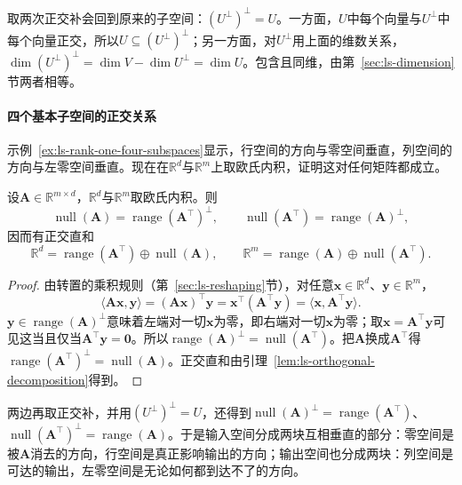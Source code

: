取两次正交补会回到原来的子空间：$(U^\perp)^\perp=U$。一方面，$U$中每个向量与$U^\perp$中每个向量正交，所以$U\subseteq(U^\perp)^\perp$；另一方面，对$U^\perp$用上面的维数关系，$\dim(U^\perp)^\perp=\dim V-\dim U^\perp=\dim U$。包含且同维，由第~\ref{sec:ls-dimension}节两者相等。

\paragraph{四个基本子空间的正交关系}
示例~\ref{ex:ls-rank-one-four-subspaces}显示，行空间的方向与零空间垂直，列空间的方向与左零空间垂直。现在在$\mathbb R^d$与$\mathbb R^m$上取欧氏内积，证明这对任何矩阵都成立。
\begin{theorem}[四个基本子空间的正交关系]
\label{thm:ls-four-subspaces-orthogonality}
设$\bm A\in\mathbb R^{m\times d}$，$\mathbb R^d$与$\mathbb R^m$取欧氏内积。则
\begin{equation}
 \operatorname{null}(\bm A)=\operatorname{range}(\bm A^\top)^\perp,\qquad
 \operatorname{null}(\bm A^\top)=\operatorname{range}(\bm A)^\perp,
 \label{eq:ls-four-subspaces-orthogonality}
\end{equation}
因而有正交直和
\begin{equation}
 \mathbb R^d=\operatorname{range}(\bm A^\top)\oplus\operatorname{null}(\bm A),\qquad
 \mathbb R^m=\operatorname{range}(\bm A)\oplus\operatorname{null}(\bm A^\top).
 \label{eq:ls-four-subspaces-decomposition}
\end{equation}
\end{theorem}
\begin{proof}
由转置的乘积规则（第~\ref{sec:ls-reshaping}节），对任意$\bm x\in\mathbb R^d$、$\bm y\in\mathbb R^m$，
\[
 \langle\bm A\bm x,\bm y\rangle=(\bm A\bm x)^\top\bm y=\bm x^\top(\bm A^\top\bm y)=\langle\bm x,\bm A^\top\bm y\rangle.
\]
$\bm y\in\operatorname{range}(\bm A)^\perp$意味着左端对一切$\bm x$为零，即右端对一切$\bm x$为零；取$\bm x=\bm A^\top\bm y$可见这当且仅当$\bm A^\top\bm y=\bm0$。所以$\operatorname{range}(\bm A)^\perp=\operatorname{null}(\bm A^\top)$。把$\bm A$换成$\bm A^\top$得$\operatorname{range}(\bm A^\top)^\perp=\operatorname{null}(\bm A)$。正交直和由引理~\ref{lem:ls-orthogonal-decomposition}得到。
\end{proof}
两边再取正交补，并用$(U^\perp)^\perp=U$，还得到$\operatorname{null}(\bm A)^\perp=\operatorname{range}(\bm A^\top)$、$\operatorname{null}(\bm A^\top)^\perp=\operatorname{range}(\bm A)$。于是输入空间分成两块互相垂直的部分：零空间是被$\bm A$消去的方向，行空间是真正影响输出的方向；输出空间也分成两块：列空间是可达的输出，左零空间是无论如何都到达不了的方向。

